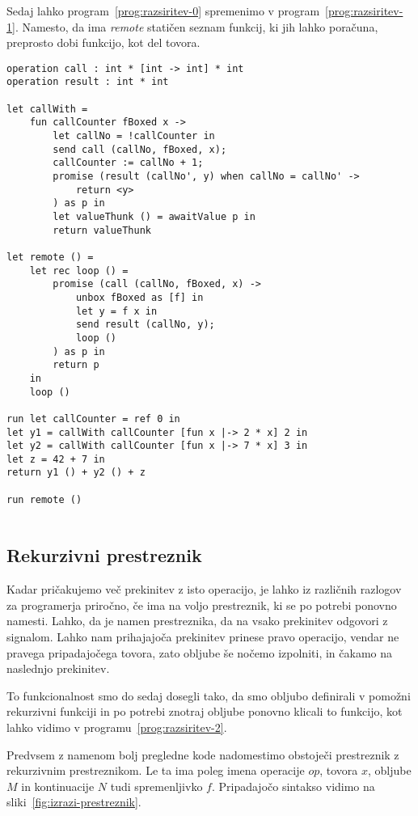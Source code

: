 Sedaj lahko program~\ref{prog:razsiritev-0} spremenimo v program~\ref{prog:razsiritev-1}. Namesto, da ima \emph{remote} statičen seznam funkcij, ki jih lahko poračuna, preprosto dobi funkcijo, kot del tovora.  

\begin{lstlisting}[caption={Računanje zahtevne funkcije v ozadju.},label={prog:razsiritev-1},float,floatplacement=h]
operation call : int * [int -> int] * int
operation result : int * int

let callWith =
	fun callCounter fBoxed x ->
		let callNo = !callCounter in
		send call (callNo, fBoxed, x);
		callCounter := callNo + 1;
		promise (result (callNo', y) when callNo = callNo' ->
			return <y>
		) as p in
		let valueThunk () = awaitValue p in
		return valueThunk

let remote () =
	let rec loop () =
		promise (call (callNo, fBoxed, x) ->
			unbox fBoxed as [f] in
			let y = f x in
			send result (callNo, y);
			loop ()
		) as p in
		return p
	in
	loop ()

run	let callCounter = ref 0 in
let y1 = callWith callCounter [fun x |-> 2 * x] 2 in
let y2 = callWith callCounter [fun x |-> 7 * x] 3 in
let z = 42 + 7 in
return y1 () + y2 () + z

run remote ()
	
\end{lstlisting}


\subsection{Rekurzivni prestreznik}




Kadar pričakujemo več prekinitev z isto operacijo, je lahko iz različnih razlogov za programerja priročno, če ima na voljo prestreznik, ki se po potrebi ponovno namesti. Lahko, da je namen prestreznika, da na vsako prekinitev odgovori z signalom. Lahko nam prihajajoča prekinitev prinese pravo operacijo, vendar ne pravega pripadajočega tovora, zato obljube še nočemo izpolniti, in čakamo na naslednjo prekinitev.

To funkcionalnost smo do sedaj dosegli tako, da smo obljubo definirali v pomožni rekurzivni funkciji in po potrebi znotraj obljube ponovno klicali to funkcijo, kot lahko vidimo v programu~\ref{prog:razsiritev-2}.


Predvsem z namenom bolj pregledne kode nadomestimo obstoječi prestreznik z rekurzivnim prestreznikom. Le ta ima poleg imena operacije $op$, tovora $x$, obljube $M$ in kontinuacije $N$ tudi spremenljivko $f$. Pripadajočo sintakso vidimo na sliki~\ref{fig:izrazi-prestreznik}.


